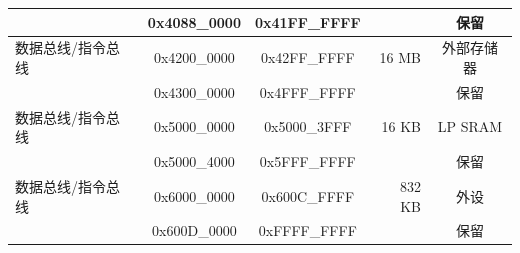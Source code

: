 \begin{ThreePartTable}
\begin{longtable}[c]{|p{3.5cm}|c|c|r|c| }
        \rowcolor{gray!25}  & 0x4088\_0000 & 0x41FF\_FFFF &         & 保留      \\\hline
        {数据总线/指令总线} & 0x4200\_0000 & 0x42FF\_FFFF & 16 MB & 外部存储器  \\\hline
        \rowcolor{gray!25}  & 0x4300\_0000 & 0x4FFF\_FFFF &         & 保留      \\\hline
        {数据总线/指令总线} & 0x5000\_0000 & 0x5000\_3FFF & 16 KB  & LP SRAM\tnote{*} \\\hline 
        \rowcolor{gray!25}  & 0x5000\_4000 & 0x5FFF\_FFFF &         & 保留      \\\hline
        {数据总线/指令总线} & 0x6000\_0000 & 0x600C\_FFFF & 832 KB  & 外设 \\\hline
        \rowcolor{gray!25}  & 0x600D\_0000 & 0xFFFF\_FFFF &         & 保留      \\\hline
        
\end{longtable}
\end{ThreePartTable}


    
